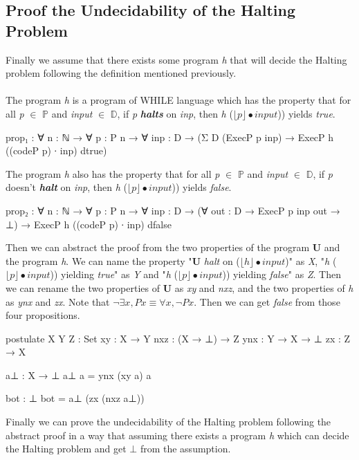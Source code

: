 \documentclass{jfrarticle}
\newcommand{\md}[1]{$\mathds{#1}$}
\begin{document}
\subsection{Proof the Undecidability of the Halting Problem}
Finally we assume that there exists some program \textit{h} that will decide the Halting problem following the definition mentioned previously.\\\\
The program \textit{h} is a program of WHILE language which has the property that for all \textit{p} $\in$ \md{P} and \textit{input} $\in$ \md{D}, if \textit{p} \textbf{\textit{halts}} on \textit{inp}, then \textit{h} ($\lfloor p\rfloor \bullet input$)) yields \textit{true}.
\begin{code}[fontsize=\small]
prop₁ : ∀ {n : ℕ} → ∀ {p : P n} → ∀ {inp : D}
	→ (Σ D (ExecP p inp) 
	→ ExecP h ((codeP p) ∙ inp) dtrue)

\end{code}
The program \textit{h} also has the property that for all \textit{p} $\in$ \md{P} and \textit{input} $\in$ \md{D}, if \textit{p} doesn't \textbf{\textit{halt}} on \textit{inp}, then \textit{h} ($\lfloor p\rfloor \bullet input$)) yields \textit{false}.
\begin{code}[fontsize=\small]
prop₂ : ∀ {n : ℕ} → ∀ {p : P n} → ∀ {inp : D}
	→ (∀ {out : D} → ExecP p inp out → ⊥) 
	→ ExecP h ((codeP p) ∙ inp) dfalse

\end{code}
Then we can abstract the proof from the two properties of the program \textbf{U} and the program \textit{h}.
We can name the property "\textbf{U} \textit{halt} on ($\lfloor h\rfloor \bullet input$)" as \textit{X}, "\textit{h} ($\lfloor p\rfloor \bullet input$)) yielding \textit{true}" as \textit{Y} and "\textit{h} ($\lfloor p\rfloor \bullet input$)) yielding \textit{false}" as \textit{Z}.
Then we can rename the two properties of \textbf{U} as \textit{xy} and \textit{nxz}, and the two properties of \textit{h} as \textit{ynx} and \textit{zx}.
Note that $\neg\exists x, P x \equiv \forall x, \neg P x$.
Then we can get \textit{false} from those four propositions.
\begin{code}[fontsize=\small]
postulate
  X Y Z : Set
  xy  : X → Y
  nxz : (X → ⊥) → Z
  ynx : Y → X → ⊥
  zx  : Z → X

a⊥ : X → ⊥
a⊥ a = ynx (xy a) a

bot : ⊥
bot = a⊥ (zx (nxz a⊥))

\end{code}
Finally we can prove the undecidability of the Halting problem following the abstract proof in a way that assuming there exists a program \textit{h} which can decide the Halting problem and get $\bot$ from the assumption.
\end{document}
